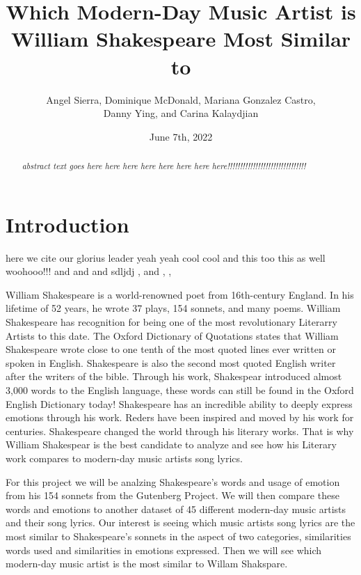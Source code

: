 \documentclass[11pt]{article}
\title {Which Modern-Day Music Artist is William Shakespeare Most Similar to\\[1ex]}
\author{
Angel Sierra, 
Dominique McDonald,
Mariana Gonzalez Castro, \\
Danny Ying,
and Carina Kalaydjian \\[1ex]
}
\date{June 7th, 2022}
\newcommand{\abstractinenglishname}{Abstract}
\newenvironment{abstractinenglish}{
        \def\abstractname{\abstractinenglishname}
	\begin{abstract}
}{
        \end{abstract}
}
\begin{document}
\maketitle
\vspace{6pt}

\begin{abstractinenglish}
\emph{abstract text goes here here here here here here here here!!!!!!!!!!!!!!!!!!!!!!!!!!!!!!!}
\end{abstractinenglish}

\section{Introduction}

here we cite \cite{web1} our glorius leader \cite{web2} yeah yeah cool cool \cite{briney2015data} and this too \cite{monkey} this as well \cite{sonnetsData} woohooo!!! \cite{musicData} and \cite{syuzhet} and \cite{tm} and \cite{shakeFacts} sdljdj \cite{k-means} , \cite{NLP-for-music} and  \cite{NLP-for-lyrics}, \cite{knowledge-graphs}, \cite{nrc-sentiment}

\noindent  William Shakespeare is a world-renowned poet from 16th-century England. In his lifetime of 52 years, he wrote 37 plays, 154 sonnets, and many poems\cite{shakeFacts}. William Shakespeare has recognition for being one of the most revolutionary Literarry Artists to this date\cite{shakeFacts}. The Oxford Dictionary of Quotations states that William Shakespeare wrote close to one tenth of the most quoted lines ever written or spoken in English\cite{shakeFacts}. Shakespeare is also the second most quoted English writer after the writers of the bible\cite{shakeFacts}. Through his work, Shakespear introduced almost  3,000 words to the English language, these words can still be found in the Oxford English Dictionary today\cite{shakeFacts}! Shakespeare has an incredible ability to deeply express emotions through his work. Reders have been inspired and moved by his work for centuries. Shakespeare changed the world through his literary works. That is why William Shakespear is the best candidate to analyze and see how his Literary work compares to modern-day music artists song lyrics. 

\noindent For this project we will be analzing Shakespeare's words and usage of emotion from his 154 sonnets from the Gutenberg Project\cite{sonnetsData}. We will then compare these words and emotions to another dataset of 45 different modern-day music artists and their song lyrics\cite{musicData}. Our interest is seeing which music artists song lyrics are the most similar to Shakespeare's sonnets in the aspect of two categories, similarities words used and similarities in emotions expressed. Then we will see which modern-day music artist is the most similar to Willam Shakspare.  
\end{document}
